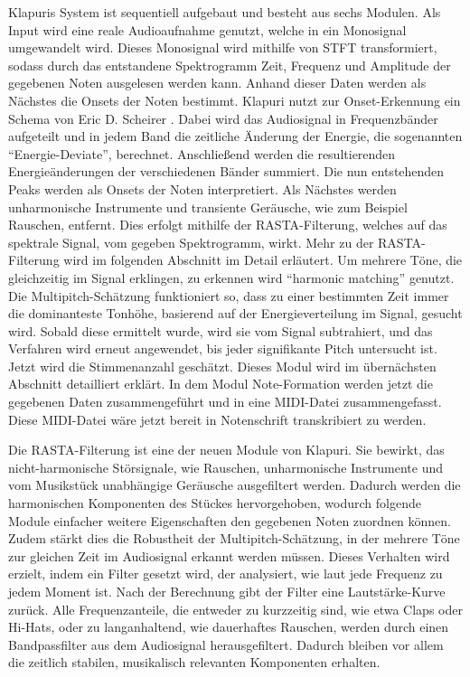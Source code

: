 Klapuris System ist sequentiell aufgebaut und besteht aus sechs Modulen.
Als Input wird eine reale Audioaufnahme genutzt, welche in ein Monosignal umgewandelt wird.
Dieses Monosignal wird mithilfe von STFT transformiert,
sodass durch das entstandene Spektrogramm Zeit,
Frequenz und Amplitude der gegebenen Noten ausgelesen werden kann.
Anhand dieser Daten werden als Nächstes die Onsets der Noten bestimmt.
Klapuri nutzt zur Onset-Erkennung ein Schema von Eric D. Scheirer \cite{scheirer1998tempo}.
Dabei wird das Audiosignal in Frequenzbänder aufgeteilt und in jedem Band die zeitliche Änderung der Energie,
die sogenannten \enquote{Energie-Deviate}, berechnet.
Anschließend werden die resultierenden Energieänderungen der verschiedenen Bänder summiert.
Die nun entstehenden Peaks werden als Onsets der Noten interpretiert.
Als Nächstes werden unharmonische Instrumente und transiente Geräusche, wie zum Beispiel Rauschen, entfernt.
Dies erfolgt mithilfe der RASTA-Filterung, welches auf das spektrale Signal, vom gegeben Spektrogramm, wirkt.
Mehr zu der RASTA-Filterung wird im folgenden Abschnitt im Detail erläutert.
Um mehrere Töne, die gleichzeitig im Signal erklingen, zu erkennen wird \enquote{harmonic matching} genutzt.
Die Multipitch-Schätzung funktioniert so, dass zu einer bestimmten Zeit immer die dominanteste Tonhöhe,
basierend auf der Energieverteilung im Signal, gesucht wird.
Sobald diese ermittelt wurde, wird sie vom Signal subtrahiert,
und das Verfahren wird erneut angewendet, bis jeder signifikante Pitch untersucht ist.
Jetzt wird die Stimmenanzahl geschätzt.
Dieses Modul wird im übernächsten Abschnitt detailliert erklärt.
In dem Modul Note-Formation werden jetzt die gegebenen Daten zusammengeführt und in eine MIDI-Datei zusammengefasst.
Diese MIDI-Datei wäre jetzt bereit in Notenschrift transkribiert zu werden.

\begin{description}[style=nextline]
\item[RASTA-Filterung]\label{itm:rasta}
Die RASTA-Filterung ist eine der neuen Module von Klapuri.
Sie bewirkt, das nicht-harmonische Störsignale, wie
Rauschen, unharmonische Instrumente und vom Musikstück unabhängige Geräusche ausgefiltert werden.
Dadurch werden die harmonischen Komponenten des Stückes hervorgehoben,
wodurch folgende Module einfacher weitere Eigenschaften den gegebenen Noten zuordnen können.
Zudem stärkt dies die Robustheit der Multipitch-Schätzung,
in der mehrere Töne zur gleichen Zeit im Audiosignal erkannt werden müssen.
Dieses Verhalten wird erzielt, indem ein Filter gesetzt wird,
der analysiert, wie laut jede Frequenz zu jedem Moment ist.
Nach der Berechnung gibt der Filter eine Lautstärke-Kurve zurück.
Alle Frequenzanteile, die entweder zu kurzzeitig sind, wie etwa Claps oder Hi-Hats, oder zu langanhaltend,
wie dauerhaftes Rauschen, werden durch einen Bandpassfilter aus dem Audiosignal herausgefiltert.
Dadurch bleiben vor allem die zeitlich stabilen, musikalisch relevanten Komponenten erhalten.
\end{description}

